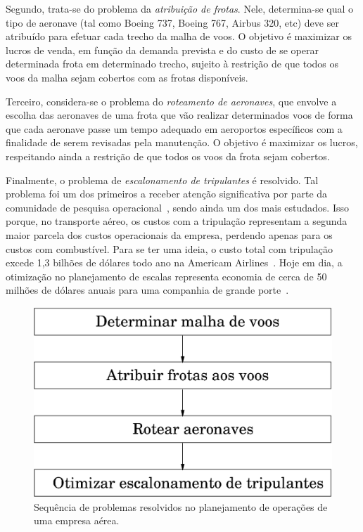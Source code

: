 \documentclass[12pt,a4paper]{article}
\begin{document}
Segundo, trata-se do problema da \emph{atribuição de frotas}. Nele, determina-se qual o tipo de
aeronave (tal como Boeing 737, Boeing 767, Airbus 320, etc) deve ser atribuído para efetuar cada
trecho da malha de voos. O objetivo é maximizar os lucros de venda, em função da demanda prevista e
do custo de se operar determinada frota em determinado trecho, sujeito à restrição de que todos os
voos da malha sejam cobertos com as frotas disponíveis.

Terceiro, considera-se o problema do \emph{roteamento de aeronaves}, que envolve a escolha das
aeronaves de uma frota que vão realizar determinados voos de forma que cada aeronave passe um tempo
adequado em aeroportos específicos com a finalidade de serem revisadas pela manutenção. O objetivo é
maximizar os lucros, respeitando ainda a restrição de que todos os voos da frota sejam cobertos.

Finalmente, o problema de \emph{escalonamento de tripulantes} é resolvido. Tal problema foi um dos
primeiros a receber atenção significativa por parte da comunidade de pesquisa
operacional~\cite{arabeyre69}, sendo ainda um dos mais estudados. Isso porque, no transporte aéreo,
os custos com a tripulação representam a segunda maior parcela dos custos operacionais da empresa,
perdendo apenas para os custos com combustível. Para se ter uma ideia, o custo total com tripulação
excede 1,3 bilhões de dólares todo ano na Americam Airlines~\cite{anbil91a}. Hoje em dia, a
otimização no planejamento de escalas representa economia de cerca de 50 milhões de dólares anuais
para uma companhia de grande porte~\cite{barnhart03}.

\begin{figure}[htbp]
	\begin{center}
		\includegraphics[scale=0.5]{fig/planejamento.eps}
		\caption{Sequência de problemas resolvidos no planejamento de operações de uma empresa aérea.}
		\label{fig:planejamento}
	\end{center}
\end{figure}
\end{document}
